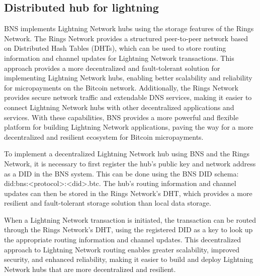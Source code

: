 \documentclass[twocolumn]{article}
\begin{document}
\subsection{Distributed hub for lightning}
BNS implements Lightning Network hubs using the storage features of the Rings Network. The Rings Network provides a structured peer-to-peer network based on Distributed Hash Tables (DHTs), which can be used to store routing information and channel updates for Lightning Network transactions. This approach provides a more decentralized and fault-tolerant solution for implementing Lightning Network hubs, enabling better scalability and reliability for micropayments on the Bitcoin network. Additionally, the Rings Network provides secure network traffic and extendable DNS services, making it easier to connect Lightning Network hubs with other decentralized applications and services. With these capabilities, BNS provides a more powerful and flexible platform for building Lightning Network applications, paving the way for a more decentralized and resilient ecosystem for Bitcoin micropayments.

To implement a decentralized Lightning Network hub using BNS and the Rings Network, it is necessary to first register the hub's public key and network address as a DID in the BNS system. This can be done using the BNS DID schema: did:bns:<protocol>:<did>.btc. The hub's routing information and channel updates can then be stored in the Rings Network's DHT, which provides a more resilient and fault-tolerant storage solution than local data storage.

When a Lightning Network transaction is initiated, the transaction can be routed through the Rings Network's DHT, using the registered DID as a key to look up the appropriate routing information and channel updates. This decentralized approach to Lightning Network routing enables greater scalability, improved security, and enhanced reliability, making it easier to build and deploy Lightning Network hubs that are more decentralized and resilient.
\end{document}

